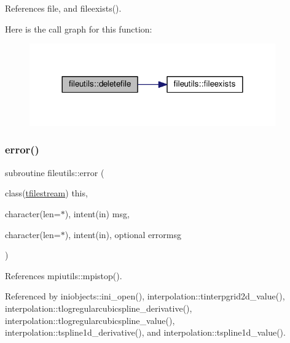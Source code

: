 References file, and fileexists().

Here is the call graph for this function\+:
\nopagebreak
\begin{figure}[H]
\begin{center}
\leavevmode
\includegraphics[width=300pt]{namespacefileutils_a4123c8130fff81627f5a0bdd7674d6f7_cgraph}
\end{center}
\end{figure}
\mbox{\label{namespacefileutils_ad8e0926f0aaad2fd9464ad5e4bc01db0}} 
\subsubsection{\texorpdfstring{error()}{error()}}
{\footnotesize\ttfamily subroutine fileutils\+::error (\begin{DoxyParamCaption}\item[{class(\mbox{\hyperlink{structfileutils_1_1tfilestream}{tfilestream}})}]{this,  }\item[{character(len=$\ast$), intent(in)}]{msg,  }\item[{character(len=$\ast$), intent(in), optional}]{errormsg }\end{DoxyParamCaption})\hspace{0.3cm}{\ttfamily [private]}}



References mpiutils\+::mpistop().



Referenced by iniobjects\+::ini\+\_\+open(), interpolation\+::tinterpgrid2d\+\_\+value(), interpolation\+::tlogregularcubicspline\+\_\+derivative(), interpolation\+::tlogregularcubicspline\+\_\+value(), interpolation\+::tspline1d\+\_\+derivative(), and interpolation\+::tspline1d\+\_\+value().

